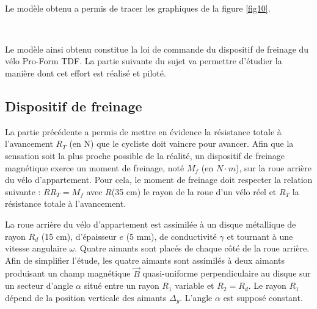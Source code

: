 
~\

Le modèle obtenu a permis de tracer les graphiques de la figure \ref{fig10}.



~\

Le modèle ainsi obtenu constitue la loi de commande du dispositif de freinage du vélo Pro-Form TDF. La partie suivante du sujet va permettre d'étudier la manière dont cet effort est réalisé et piloté.

\subsection{Dispositif de freinage}


La partie précédente a permis de mettre en évidence la résistance totale à l’avancement $R_T$ (en N) que le cycliste doit vaincre pour avancer. Afin que la sensation soit la plus proche possible de la réalité, un dispositif de freinage
magnétique exerce un moment de freinage, noté $M_f$ (en $N\cdot m$), sur la roue arrière du vélo d’appartement. Pour cela, le moment de freinage doit respecter la relation suivante : $R R_T=M_f$ avec $R$(35 cm) le rayon de la roue d’un vélo réel et $R_T$ la résistance totale à l’avancement.


La roue arrière du vélo d’appartement est assimilée à un disque métallique de rayon $R_d$ (15 cm), d’épaisseur $e$ (5 mm), de conductivité $\gamma$ et tournant à une vitesse angulaire $\omega$. Quatre aimants sont placés de chaque côté
de la roue arrière. Afin de simplifier l’étude, les quatre aimants sont assimilés à deux aimants produisant un champ magnétique $\vec{B}$ quasi-uniforme perpendiculaire au disque sur un secteur d’angle $\alpha$ situé entre un rayon $R_1$ variable et $R_2=R_d$. Le rayon $R_1$ dépend de la position verticale des aimants $\Delta_y$. L’angle $\alpha$ est supposé constant.

